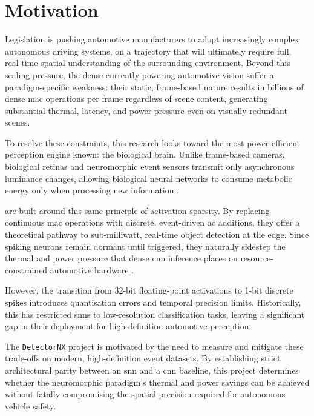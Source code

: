 \section{Motivation}
\label{sec:intro_motivation}

Legislation is pushing automotive manufacturers to adopt increasingly complex autonomous driving systems, on a trajectory that will ultimately require full, real-time spatial understanding of the surrounding environment. 
Beyond this scaling pressure, the dense  currently powering automotive vision suffer a paradigm-specific weakness: their static, frame-based nature results in billions of dense \gls{mac} operations per frame regardless of scene content, generating substantial thermal, latency, and power pressure even on visually redundant scenes.

To resolve these constraints, this research looks toward the most power-efficient perception engine known: the biological brain. 
Unlike frame-based cameras, biological retinas and neuromorphic event sensors transmit only asynchronous luminance changes, allowing biological neural networks to consume metabolic energy only when processing new information \cite{pfeiffer_snn_opportunities}.

 are built around this same principle of activation sparsity. 
By replacing continuous \gls{mac} operations with discrete, event-driven \gls{ac} additions, they offer a theoretical pathway to sub-milliwatt, real-time object detection at the edge. 
Since spiking neurons remain dormant until triggered, they naturally sidestep the thermal and power pressure that dense \gls{cnn} inference places on resource-constrained automotive hardware \cite{lin_adas_cnn_issues}.

However, the transition from 32-bit floating-point activations to 1-bit discrete spikes introduces quantisation errors and temporal precision limits. 
Historically, this has restricted \glspl{snn} to low-resolution classification tasks, leaving a significant gap in their deployment for high-definition automotive perception.

The \texttt{DetectorNX} project is motivated by the need to measure and mitigate these trade-offs on modern, high-definition event datasets. 
By establishing strict architectural parity between an \gls{snn} and a \gls{cnn} baseline, this project determines whether the neuromorphic paradigm's thermal and power savings can be achieved without fatally compromising the spatial precision required for autonomous vehicle safety.